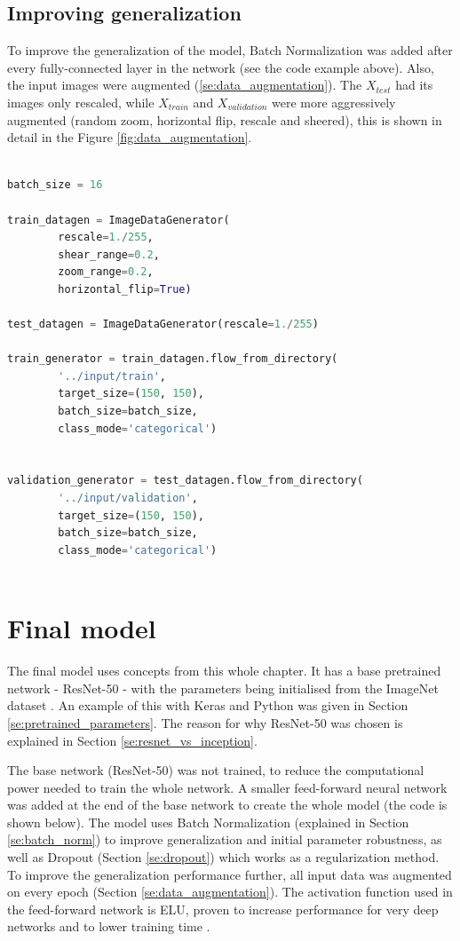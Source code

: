 \documentclass[times, utf8, diplomski]{fer}
\begin{document}
\subsection{Improving generalization}

To improve the generalization of the model, Batch Normalization was added after every fully-connected layer in the network (see the code example above). Also, the input images were augmented (\ref{se:data_augmentation}). The $X_{test}$ had its images only rescaled, while $X_{train}$ and $X_{validation}$ were more aggressively augmented (random zoom, horizontal flip, rescale and sheered), this is shown in detail in the Figure \ref{fig:data_augmentation}.

\begin{lstlisting}[language=Python, caption=Data augmentation of the input dataset (images)]

batch_size = 16

train_datagen = ImageDataGenerator(
        rescale=1./255,
        shear_range=0.2,
        zoom_range=0.2,
        horizontal_flip=True)

test_datagen = ImageDataGenerator(rescale=1./255)

train_generator = train_datagen.flow_from_directory(
        '../input/train',
        target_size=(150, 150),
        batch_size=batch_size,
        class_mode='categorical') 


validation_generator = test_datagen.flow_from_directory(
        '../input/validation',
        target_size=(150, 150),
        batch_size=batch_size,
        class_mode='categorical')
        
\end{lstlisting}

\section{Final model}
The final model uses concepts from this whole chapter. It has a base pretrained network - ResNet-50 \citep{he_deep_2016} - with the parameters being initialised from the ImageNet dataset \citep{imagenet}. An example of this with Keras \citep{keras} and Python was given in Section \ref{se:pretrained_parameters}. The reason for why ResNet-50 was chosen is explained in Section \ref{se:resnet_vs_inception}.

The base network (ResNet-50) was not trained, to reduce the computational power needed to train the whole network. A smaller feed-forward neural network was added at the end of the base network to create the whole model (the code is shown below). The model uses Batch Normalization (explained in Section \ref{se:batch_norm}) to improve generalization and initial parameter robustness, as well as Dropout (Section \ref{se:dropout}) which works as a regularization method. To improve the generalization performance further, all input data was augmented on every epoch (Section \ref{se:data_augmentation}). The activation function used in the feed-forward network is ELU, proven to increase performance for very deep networks and to lower training time \citep{clevert_fast_2015}.
\end{document}
